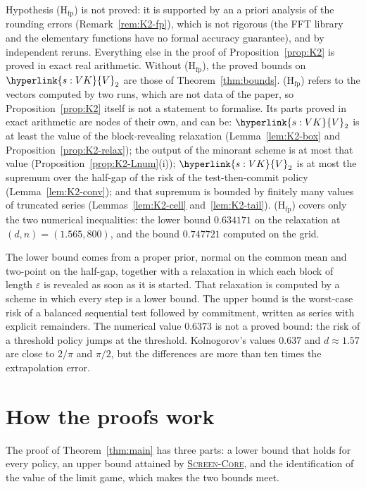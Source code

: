 \documentclass[11pt]{article}
\DeclareRobustCommand{\sy}[2]{{\hyperlink{#1}{#2}}}
\newcommand{\1}{\mathbf{1}}
\newcommand{\VK}{\sy{s:VK}{V}}
\newcommand{\SC}{\sy{alg:sc}{\textsc{Screen-Core}}}
\begin{document}
\noindent Hypothesis (H$_{\mathrm{fp}}$) is not proved: it is supported by an a priori analysis of the rounding errors (Remark~\ref{rem:K2-fp}), which is not
rigorous (the FFT library and the elementary functions have no formal accuracy guarantee), and by independent reruns. Everything else in the proof of
Proposition~\ref{prop:K2} is proved in exact real arithmetic. Without (H$_{\mathrm{fp}}$), the proved bounds on $\VK_2$ are those of Theorem~\ref{thm:bounds}.
(H$_{\mathrm{fp}}$) refers to the vectors computed by two runs, which are not data of the paper, so Proposition~\ref{prop:K2} itself is not a statement to
formalise. Its parts proved in exact arithmetic are nodes of their own, and can be: $\VK_2$ is at least the value of the block-revealing
relaxation (Lemma~\ref{lem:K2-box} and Proposition~\ref{prop:K2-relax}); the output of the minorant scheme is at most that value
(Proposition~\ref{prop:K2-Lnum}(i)); $\VK_2$ is at most the supremum over the half-gap of the risk of the test-then-commit policy
(Lemma~\ref{lem:K2-conv}); and that supremum is bounded by finitely many values of truncated series (Lemmas~\ref{lem:K2-cell} and~\ref{lem:K2-tail}).
(H$_{\mathrm{fp}}$) covers only the two numerical inequalities: the lower bound $0.634171$ on the relaxation at $(d,n)=(1.565,800)$, and the bound
$0.747721$ computed on the grid.

\noindent The lower bound comes from a proper prior, normal on the common mean and two-point on the half-gap, together with a relaxation in which each block of length $\varepsilon$ is revealed
as soon as it is started. That relaxation is computed by a scheme in which every step is a lower bound. The upper bound is the worst-case risk of a balanced sequential test
followed by commitment, written as series with explicit remainders. The numerical value $0.6373$ is not a proved bound: the risk of a threshold policy jumps at the
threshold. Kolnogorov's values $0.637$ and $d\approx1.57$ are close to $2/\pi$ and $\pi/2$, but the differences are more than ten times the extrapolation error.



\section{How the proofs work}\label{sec:overview}

The proof of Theorem~\ref{thm:main} has three parts: a lower bound that holds for every policy, an upper bound attained by \SC, and the identification of the
value of the limit game, which makes the two bounds meet.
\end{document}
